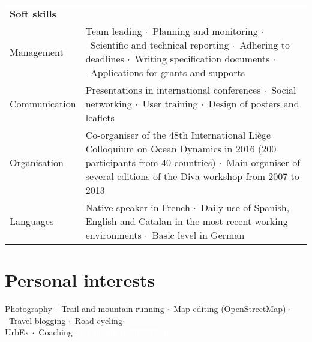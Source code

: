 \documentclass[10pt,a4paper,svgnames]{article}
\newcommand{\sepa}{$\cdot$~}
\begin{document}
\begin{tabular}{p{}| p{}}
\textbf{Soft skills}\hrulefill& \\

Management & Team leading \sepa Planning and monitoring \sepa Scientific and technical reporting \sepa Adhering to deadlines \sepa Writing specification documents \sepa Applications for grants and supports\\

Communication & Presentations in international conferences \sepa Social networking \sepa User training \sepa Design of posters and leaflets\\

Organisation & Co-organiser of the 48th International Li\`{e}ge Colloquium on Ocean Dynamics in 2016 (200 participants from 40 countries) \sepa Main organiser of several editions of the Diva workshop from 2007 to 2013\\

Languages & Native speaker in French \sepa Daily use of Spanish, English and Catalan in the most recent working environments \sepa Basic level in German
\end{tabular}




%



\section*{Personal interests}

Photography \sepa Trail and mountain running \sepa Map editing (OpenStreetMap) \sepa Travel blogging \sepa Road cycling\sepa \\  UrbEx \sepa Coaching \hfill  \textcolor{white}{Last modified: \today}
\end{document}
